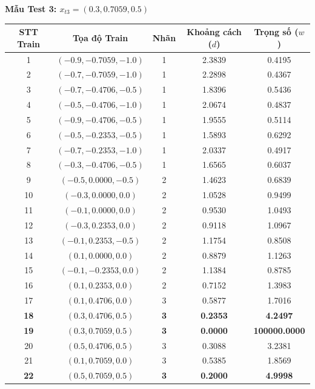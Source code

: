 \documentclass[12pt,a4paper]{article}
\begin{document}
\newpage
\textbf{Mẫu Test 3: $x_{t3} = (0.3, 0.7059, 0.5)$}
\begin{table}[H]
\centering
\footnotesize
\renewcommand{\arraystretch}{0.85}
\begin{tabular}{|c|c|c|c|c|}
\hline
\textbf{STT Train} & \textbf{Tọa độ Train} & \textbf{Nhãn} & \textbf{Khoảng cách ($d$)} & \textbf{Trọng số ($w$)} \\ \hline
1 & $(-0.9, -0.7059, -1.0)$ & 1 & 2.3839 & 0.4195 \\ \hline
2 & $(-0.7, -0.7059, -1.0)$ & 1 & 2.2898 & 0.4367 \\ \hline
3 & $(-0.7, -0.4706, -0.5)$ & 1 & 1.8396 & 0.5436 \\ \hline
4 & $(-0.5, -0.4706, -1.0)$ & 1 & 2.0674 & 0.4837 \\ \hline
5 & $(-0.9, -0.4706, -0.5)$ & 1 & 1.9555 & 0.5114 \\ \hline
6 & $(-0.5, -0.2353, -0.5)$ & 1 & 1.5893 & 0.6292 \\ \hline
7 & $(-0.7, -0.2353, -1.0)$ & 1 & 2.0337 & 0.4917 \\ \hline
8 & $(-0.3, -0.4706, -0.5)$ & 1 & 1.6565 & 0.6037 \\ \hline
9 & $(-0.5, 0.0000, -0.5)$ & 2 & 1.4623 & 0.6839 \\ \hline
10 & $(-0.3, 0.0000, 0.0)$ & 2 & 1.0528 & 0.9499 \\ \hline
11 & $(-0.1, 0.0000, 0.0)$ & 2 & 0.9530 & 1.0493 \\ \hline
12 & $(-0.3, 0.2353, 0.0)$ & 2 & 0.9118 & 1.0967 \\ \hline
13 & $(-0.1, 0.2353, -0.5)$ & 2 & 1.1754 & 0.8508 \\ \hline
14 & $(0.1, 0.0000, 0.0)$ & 2 & 0.8879 & 1.1263 \\ \hline
15 & $(-0.1, -0.2353, 0.0)$ & 2 & 1.1384 & 0.8785 \\ \hline
16 & $(0.1, 0.2353, 0.0)$ & 2 & 0.7152 & 1.3983 \\ \hline
17 & $(0.1, 0.4706, 0.0)$ & 3 & 0.5877 & 1.7016 \\ \hline
\textbf{18} & $\mathbf{(0.3, 0.4706, 0.5)}$ & \textbf{3} & \textbf{0.2353} & \textbf{4.2497} \\ \hline
\textbf{19} & $\mathbf{(0.3, 0.7059, 0.5)}$ & \textbf{3} & \textbf{0.0000} & \textbf{100000.0000} \\ \hline
20 & $(0.5, 0.4706, 0.5)$ & 3 & 0.3088 & 3.2381 \\ \hline
21 & $(0.1, 0.7059, 0.0)$ & 3 & 0.5385 & 1.8569 \\ \hline
\textbf{22} & $\mathbf{(0.5, 0.7059, 0.5)}$ & \textbf{3} & \textbf{0.2000} & \textbf{4.9998} \\ \hline

\end{tabular}
\end{table}
\end{document}
